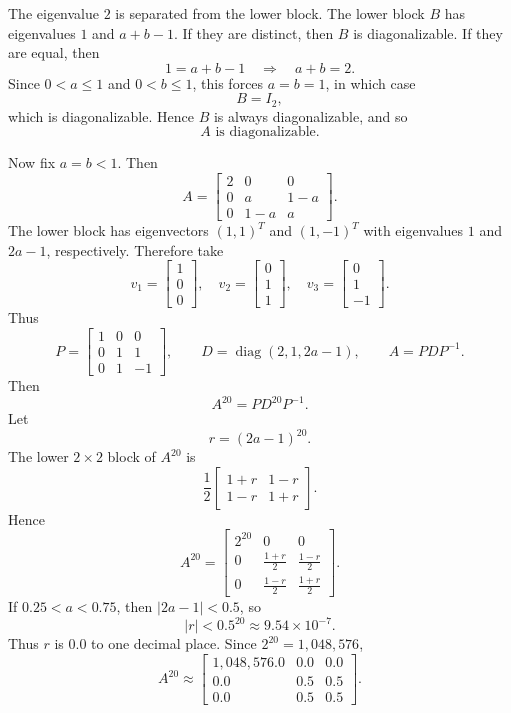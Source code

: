 \documentclass[12pt]{article}
\newcommand{\diag}{\operatorname{diag}}
\begin{document}
The eigenvalue $2$ is separated from the lower block. The lower block $B$ has eigenvalues $1$ and $a+b-1$. If they are distinct, then $B$ is diagonalizable. If they are equal, then
\[
1=a+b-1 \quad\Longrightarrow\quad a+b=2.
\]
Since $0<a\le1$ and $0<b\le1$, this forces $a=b=1$, in which case
\[
B=I_2,
\]
which is diagonalizable. Hence $B$ is always diagonalizable, and so
\[
\boxed{A\text{ is diagonalizable}.}
\]

Now fix $a=b<1$. Then
\[
A=\begin{bmatrix}
2&0&0\\
0&a&1-a\\
0&1-a&a
\end{bmatrix}.
\]
The lower block has eigenvectors $(1,1)^T$ and $(1,-1)^T$ with eigenvalues $1$ and $2a-1$, respectively. Therefore take
\[
v_1=\begin{bmatrix}1\\0\\0\end{bmatrix},
\quad
v_2=\begin{bmatrix}0\\1\\1\end{bmatrix},
\quad
v_3=\begin{bmatrix}0\\1\\-1\end{bmatrix}.
\]
Thus
\[
\boxed{
P=\begin{bmatrix}1&0&0\\0&1&1\\0&1&-1\end{bmatrix},
\qquad
D=\diag(2,1,2a-1),
\qquad A=PDP^{-1}.}
\]
Then
\[
A^{20}=PD^{20}P^{-1}.
\]
Let
\[
r=(2a-1)^{20}.
\]
The lower $2\times2$ block of $A^{20}$ is
\[
\frac12\begin{bmatrix}1+r&1-r\\1-r&1+r\end{bmatrix}.
\]
Hence
\[
A^{20}=\begin{bmatrix}
2^{20}&0&0\\
0&\frac{1+r}{2}&\frac{1-r}{2}\\
0&\frac{1-r}{2}&\frac{1+r}{2}
\end{bmatrix}.
\]
If $0.25<a<0.75$, then $|2a-1|<0.5$, so
\[
|r|<0.5^{20}\approx9.54\times10^{-7}.
\]
Thus $r$ is $0.0$ to one decimal place. Since $2^{20}=1{,}048{,}576$,
\[
\boxed{
A^{20}\approx
\begin{bmatrix}
1{,}048{,}576.0&0.0&0.0\\
0.0&0.5&0.5\\
0.0&0.5&0.5
\end{bmatrix}.}
\]
\end{document}
